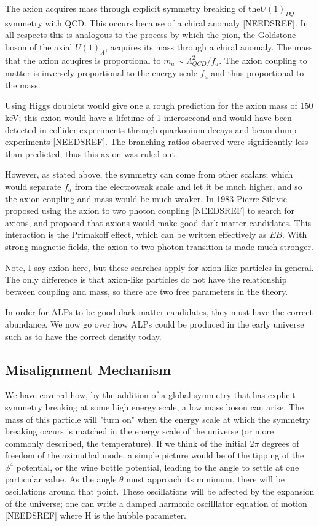 \documentclass[12pt, twoside]{book}
\begin{document}
The axion acquires mass through explicit symmetry breaking of the$U(1)_{PQ}$ symmetry with QCD. This occurs because of a chiral anomaly [NEEDSREF]. In all respects this is analogous to the process by which the pion, the Goldstone boson of the axial $U(1)_A$, acquires its mass through a chiral anomaly. The mass that the axion acuqires is proportional to $m_a \sim \Lambda_{QCD}^2/f_a$. The axion coupling to matter is inversely proportional to the energy scale $f_a$ and thus proportional to the mass.

Using Higgs doublets would give one a rough prediction for the axion mass of 150 keV; this axion would have a lifetime of 1 microsecond and would have been detected in collider experiments through quarkonium decays and beam dump experiments [NEEDSREF]. The branching ratios observed were significantly less than predicted; thus this axion was ruled out.

However, as stated above, the symmetry can come from other scalars; which would separate $f_a$ from the electroweak scale and let it be much higher, and so the axion coupling and mass would be much weaker. In 1983 Pierre Sikivie proposed using the axion to two photon coupling [NEEDSREF] to search for axions, and proposed that axions would make good dark matter candidates. This interaction is the Primakoff effect, which can be written effectively as $E \dot B$. With strong magnetic fields, the axion to two photon transition is made much stronger.

Note, I say axion here, but these searches apply for axion-like particles in general. The only difference is that axion-like particles do not have the relationship between coupling and mass, so there are two free parameters in the theory.

In order for ALPs to be good dark matter candidates, they must have the correct abundance. We now go over how ALPs could be produced in the early universe such as to have the correct density today.

\subsection{Misalignment Mechanism}

We have covered how, by the addition of a global symmetry that has explicit symmetry breaking at some high energy scale, a low mass boson can arise. The mass of this particle will "turn on" when the energy scale at which the symmetry breaking occurs is matched in the energy scale of the universe (or more commonly described, the temperature). If we think of the initial 2$\pi$ degrees of freedom of the azimuthal mode, a simple picture would be of the tipping of the $\phi^4$ potential, or the wine bottle potential, leading to the angle to settle at one particular value. As the angle $\theta$ must approach its minimum, there will be oscillations around that point. These oscillations will be affected by the expansion of the universe; one can write a damped harmonic oscilllator equation of motion [NEEDSREF] where H is the hubble parameter.
\end{document}
